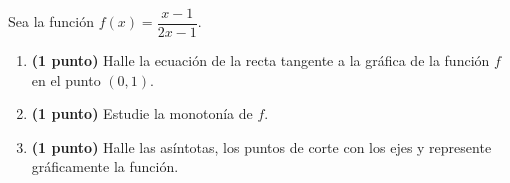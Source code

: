 
Sea la función $f(x)=\dfrac{x-1}{2x-1}$.
\begin{enumerate}[label=\alph*)]
\item \textbf{(1 punto)} Halle la ecuación de la recta tangente a la gráfica de la función $f$ en el punto $(0,1)$.
\item \textbf{(1 punto)} Estudie la monotonía de $f$.
\item \textbf{(1 punto)} Halle las asíntotas, los puntos de corte con los ejes y represente gráficamente la función.
\end{enumerate}
